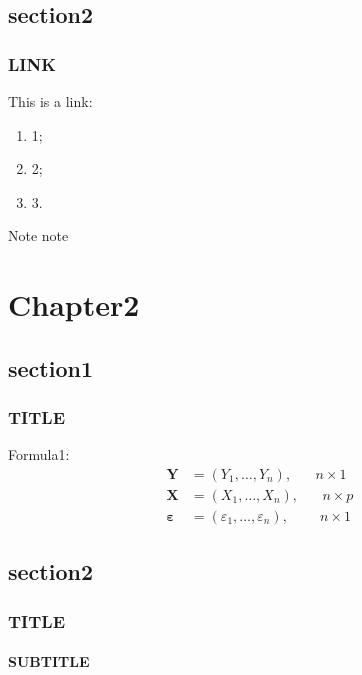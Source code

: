 \documentclass[xcolor=svgnames]{beamer}
\begin{document}
\subsection{section2}
\begin{frame}
  \frametitle{LINK}
    This is a link:

    \begin{center}
      \begin{Large}
        \color{red}{http://www.baidu.com/}
      \end{Large}
    \end{center}

    \begin{enumerate}
      \item 1;
      \item 2;
      \item 3.
    \end{enumerate}


    \begin{block}{Note}
     note
    \end{block}
\end{frame}


\section{Chapter2}
\subsection{section1}
\begin{frame}[fragile]
  \frametitle{TITLE}
  Formula1:
    \begin{align*}
\boldsymbol{Y}  & =\left(  Y_{1},\ldots,Y_{n}\right),
\quad \text{  }n\times1 \\
\boldsymbol{X}  & =\left(
{X}_{1},\ldots,{X}_{n}\right),\quad \text{ }n\times p \\
\boldsymbol{\varepsilon} & =\left(
\varepsilon_{1},\ldots,\varepsilon_{n}\right),\quad \;\;\text{   }n\times1
\end{align*}

\end{frame}


\subsection{section2}
\begin{frame}[fragile]
  \frametitle{TITLE}
  \framesubtitle{SUBTITLE}


\end{frame}
\end{document}
